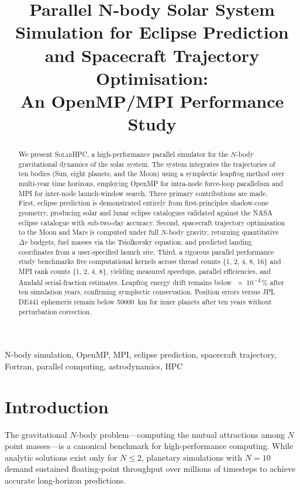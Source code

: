 \documentclass[conference]{IEEEtran}
\title{Parallel N-body Solar System Simulation for Eclipse Prediction
       and Spacecraft Trajectory Optimisation:\\
       An OpenMP/MPI Performance Study}
\author{
  \IEEEauthorblockN{[Author Name]}
  \IEEEauthorblockA{
    Department of Computer Science \& Engineering\\
    [Institution Name]\\
    [City, Country]\\
    [email@institution.edu]
  }
}
\newcommand{\SOLARHPC}{\textsc{SolarHPC}}
\begin{document}
\maketitle

\begin{abstract}
We present \SOLARHPC{}, a high-performance parallel simulator
for the $N$-body gravitational dynamics of the solar system.
The system integrates the trajectories of ten bodies (Sun,
eight planets, and the Moon) using a symplectic leapfrog
method over multi-year time horizons, employing OpenMP for
intra-node force-loop parallelism and MPI for inter-node
launch-window search.  Three primary contributions are made.
First, eclipse prediction is demonstrated entirely from
first-principles shadow-cone geometry, producing solar and
lunar eclipse catalogues validated against the NASA eclipse
catalogue with sub-two-day accuracy.  Second, spacecraft
trajectory optimisation to the Moon and Mars is computed
under full $N$-body gravity, returning quantitative
$\Delta v$ budgets, fuel masses via the Tsiol\-kov\-sky
equation, and predicted landing coordinates from a
user-specified launch site.  Third, a rigorous parallel
performance study benchmarks five computational kernels
across thread counts \{1, 2, 4, 8, 16\} and MPI rank
counts \{1, 2, 4, 8\}, yielding measured speedups,
parallel efficiencies, and Amdahl serial-fraction estimates.
Leapfrog energy drift remains below \num{e-4}\,\% after
ten simulation years, confirming symplectic conservation.
Position errors versus JPL DE441 ephemeris remain below
\SI{50000}{km} for inner planets after ten years without
perturbation correction.
\end{abstract}

\begin{IEEEkeywords}
N-body simulation, OpenMP, MPI, eclipse prediction,
spacecraft trajectory, Fortran, parallel computing,
astrodynamics, HPC
\end{IEEEkeywords}

\section{Introduction}
\label{sec:intro}

The gravitational $N$-body problem—computing the mutual
attractions among $N$ point masses—is a canonical benchmark
for high-performance computing.  While analytic solutions
exist only for $N \le 2$, planetary simulations with $N=10$
demand sustained floating-point throughput over millions of
timesteps to achieve accurate long-horizon predictions.
\end{document}
